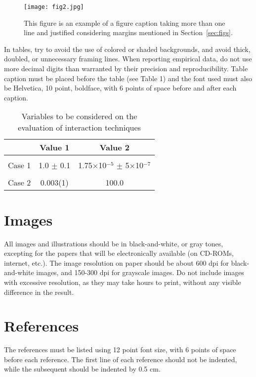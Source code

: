 \documentclass[12pt]{article}
\begin{document}
\begin{figure}[ht]
\centering
\texttt{[image: fig2.jpg]}
\caption{This figure is an example of a figure caption taking more than one
  line and justified considering margins mentioned in Section~\ref{sec:figs}.}
\label{fig:exampleFig2}
\end{figure}

In tables, try to avoid the use of colored or shaded backgrounds, and avoid
thick, doubled, or unnecessary framing lines. When reporting empirical data,
do not use more decimal digits than warranted by their precision and
reproducibility. Table caption must be placed before the table (see Table 1)
and the font used must also be Helvetica, 10 point, boldface, with 6 points of
space before and after each caption.

\begin{table}[ht]
\centering
\caption{Variables to be considered on the evaluation of interaction
  techniques}
\label{tab:exTable1}
\smallskip
\begin{tabular}{|l|c|c|}
\hline
& Value 1 & Value 2\\[0.5ex]
\hline
&&\\[-2ex]
Case 1 & 1.0 $\pm$ 0.1 & 1.75$\times$10$^{-5}$ $\pm$ 5$\times$10$^{-7}$\\[0.5ex]
\hline
&&\\[-2ex]
Case 2 & 0.003(1) & 100.0\\[0.5ex]
\hline
\end{tabular}
\end{table}

\section{Images}

All images and illustrations should be in black-and-white, or gray tones,
excepting for the papers that will be electronically available (on CD-ROMs,
internet, etc.). The image resolution on paper should be about 600 dpi for
black-and-white images, and 150-300 dpi for grayscale images.  Do not include
images with excessive resolution, as they may take hours to print, without any
visible difference in the result.

\section{References}

The references must be listed using 12 point font size, with 6 points of space
before each reference. The first line of each reference should not be
indented, while the subsequent should be indented by 0.5 cm.





\end{document}
